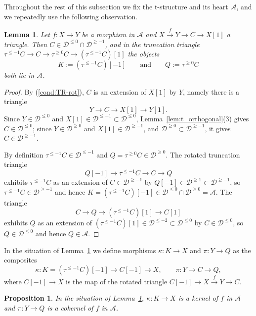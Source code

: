 \documentclass[12pt]{amsart}
\newcommand{\condref}[1]{\textup{(\ref{#1})}}
\newtheorem{proposition}[theorem]{Proposition}
\newtheorem{lemma}[theorem]{Lemma}
\numberwithin{theorem}{section}
\theoremstyle{definition}
\newcommand{\calA}{\mathcal{A}}
\newcommand{\calD}{\mathcal{D}}
\newcommand{\Dle}[1]{\calD^{\leqslant #1}}
\newcommand{\Dge}[1]{\calD^{\geqslant #1}}
\begin{document}
	Throughout the rest of this subsection we fix the t-structure and its heart $\calA$, and we repeatedly use the following observation.
	
	\begin{lemma}
		\label{lem:cone_in_heart}
		Let $f \colon X \to Y$ be a morphism in $\calA$ and $X \xrightarrow{f} Y \to C \to X[1]$ a triangle.
		Then $C \in \Dle{0} \cap \Dge{-1}$, and in the truncation triangle $\tau^{\leqslant -1} C \to C \to \tau^{\geqslant 0} C \to (\tau^{\leqslant -1} C)[1]$ the objects
		\[
		K := (\tau^{\leqslant -1} C)[-1] \qquad\text{and}\qquad Q := \tau^{\geqslant 0} C
		\]
		both lie in $\calA$.
	\end{lemma}
	
	\begin{proof}
		By \condref{cond:TR-rot}, $C$ is an extension of $X[1]$ by $Y$, namely there is a triangle 
		\[
		Y \to C \to X[1] \to Y[1].
		\]
		Since $Y \in \Dle{0}$ and $X[1] \in \Dle{-1} \subset \Dle{0}$, Lemma~\ref{lem:t_orthogonal}(3) gives $C \in \Dle{0}$;
		since $Y \in \Dge{0}$ and $X[1] \in \Dge{-1}$, and $\Dge{0} \subset \Dge{-1}$, it gives $C \in \Dge{-1}$.
		
		By definition $\tau^{\leqslant -1} C \in \Dle{-1}$ and $Q = \tau^{\geqslant 0} C \in \Dge{0}$.
		The rotated truncation triangle 
		\[
		Q[-1] \to \tau^{\leqslant -1} C \to C \to Q
		\] 
		exhibits $\tau^{\leqslant -1} C$ as an extension of $C \in \Dge{-1}$ by $Q[-1] \in \Dge{1} \subset \Dge{-1}$,
		so $\tau^{\leqslant -1} C \in \Dge{-1}$ and hence 
		$K = (\tau^{\leqslant -1} C)[-1] \in \Dle{0} \cap \Dge{0} = \calA$.
		The triangle 
		\[
		C \to Q \to (\tau^{\leqslant -1} C)[1] \to C[1]
		\] 
		exhibits $Q$ as an extension of $(\tau^{\leqslant -1} C)[1] \in \Dle{-2} \subset \Dle{0}$ by $C \in \Dle{0}$, so $Q \in \Dle{0}$ and hence $Q \in \calA$.
	\end{proof}
	
	In the situation of Lemma~\ref{lem:cone_in_heart} we define morphisms $\kappa \colon K \to X$ and $\pi \colon Y \to Q$ as the composites
	\[
	\kappa \colon K = (\tau^{\leqslant -1} C)[-1] \longrightarrow C[-1] \longrightarrow X ,
	\qquad
	\pi \colon Y \longrightarrow C \longrightarrow Q ,
	\]
	where $C[-1] \to X$ is the map of the rotated triangle $C[-1] \to X \xrightarrow{f} Y \to C$.
	
	\begin{proposition}
		\label{prop:kernel_cokernel}
		In the situation of Lemma~\ref{lem:cone_in_heart}, $\kappa \colon K \to X$ is a kernel of $f$ in $\calA$ and $\pi \colon Y \to Q$ is a cokernel of $f$ in $\calA$.
	\end{proposition}
	
\end{document}
